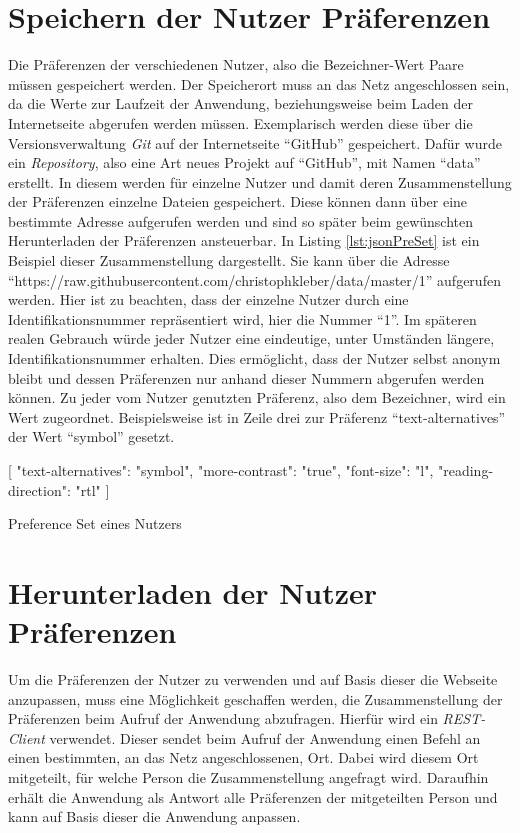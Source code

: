 \documentclass[12pt, paper=a4, bibtotoc, toc=listof, headsepline=true]{scrreprt}
\begin{document}
\section{Speichern der Nutzer Präferenzen}
Die Präferenzen der verschiedenen Nutzer, also die Bezeichner-Wert Paare müssen gespeichert werden. Der Speicherort muss an das Netz angeschlossen sein, da die Werte zur Laufzeit der Anwendung, beziehungsweise beim Laden der Internetseite abgerufen werden müssen. Exemplarisch werden diese über die Versionsverwaltung \emph{Git} auf der Internetseite \enquote{GitHub} gespeichert. Dafür wurde ein \emph{Repository}, also eine Art neues Projekt auf \enquote{GitHub}, mit Namen \enquote{data} erstellt. In diesem werden für einzelne Nutzer und damit deren Zusammenstellung der Präferenzen einzelne  Dateien gespeichert. Diese können dann über eine bestimmte Adresse aufgerufen werden und sind so später beim gewünschten Herunterladen der Präferenzen ansteuerbar. In Listing \ref{lst:jsonPreSet} ist ein Beispiel dieser Zusammenstellung dargestellt. Sie kann über
\newline
die Adresse \enquote{https://raw.githubusercontent.com/christophkleber/data/master/1} aufgerufen werden. Hier ist zu beachten, dass der einzelne Nutzer durch eine Identifikationsnummer repräsentiert wird, hier die Nummer \enquote{1}. Im späteren realen Gebrauch würde jeder Nutzer eine eindeutige, unter Umständen längere, Identifikationsnummer erhalten. Dies ermöglicht, dass der Nutzer selbst anonym bleibt und dessen Präferenzen nur anhand dieser Nummern abgerufen werden können. Zu jeder vom Nutzer genutzten Präferenz, also dem Bezeichner, wird ein Wert zugeordnet. Beispielsweise ist in Zeile drei zur Präferenz \enquote{text-alternatives} der Wert \enquote{symbol} gesetzt. 
\begin{listing}
	\begin{JavaScriptcode*}{}
[
   {
      "text-alternatives": "symbol",
      "more-contrast": "true",
      "font-size": "l",
      "reading-direction": "rtl"
   }
]
	\end{JavaScriptcode*}
	\caption[Beispiel eines Preference Sets]{Preference Set eines Nutzers}
	\label{lst:jsonPreSet}
\end{listing}

\section{Herunterladen der Nutzer Präferenzen}
Um die Präferenzen der Nutzer zu verwenden und auf Basis dieser die Webseite anzupassen, muss eine Möglichkeit geschaffen werden, die Zusammenstellung der Präferenzen beim Aufruf der Anwendung abzufragen. Hierfür wird ein \emph{REST-Client} verwendet. Dieser sendet beim Aufruf der Anwendung einen Befehl an einen bestimmten, an das Netz angeschlossenen, Ort. Dabei wird diesem Ort mitgeteilt, für welche Person die Zusammenstellung angefragt wird. Daraufhin erhält die Anwendung als Antwort alle Präferenzen der mitgeteilten Person und kann auf Basis dieser die Anwendung anpassen.
\end{document}
